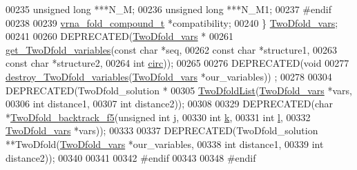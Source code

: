 \begin{DoxyCode}
00235   \textcolor{keywordtype}{unsigned} \textcolor{keywordtype}{long}         ***N\_M;
00236   \textcolor{keywordtype}{unsigned} \textcolor{keywordtype}{long}         ***N\_M1;
00237 \textcolor{preprocessor}{#endif}
00238 
00239   \hyperlink{group__fold__compound_structvrna__fc__s}{vrna\_fold\_compound\_t}  *compatibility;
00240 \} \hyperlink{group__kl__neighborhood__mfe_gaf4f514010a14f9d59d850742b3e96954}{TwoDfold\_vars};
00241 
00260 DEPRECATED(\hyperlink{group__kl__neighborhood__mfe_structTwoDfold__vars}{TwoDfold\_vars} *
00261            \hyperlink{group__kl__neighborhood__mfe_gac9284f132cf0eaa0a2f43590eda05488}{get\_TwoDfold\_variables}(\textcolor{keyword}{const} \textcolor{keywordtype}{char}  *seq,
00262                                   \textcolor{keyword}{const} \textcolor{keywordtype}{char}  *structure1,
00263                                   \textcolor{keyword}{const} \textcolor{keywordtype}{char}  *structure2,
00264                                   \textcolor{keywordtype}{int}         \hyperlink{group__model__details_gaf9202a1a09f5828dc731e2d9a10fa111}{circ}));
00265 
00276 DEPRECATED(\textcolor{keywordtype}{void}
00277            \hyperlink{group__kl__neighborhood__mfe_ga05bf4f31d216b1b160fd2d3d68e9b487}{destroy\_TwoDfold\_variables}(\hyperlink{group__kl__neighborhood__mfe_structTwoDfold__vars}{TwoDfold\_vars} *our\_variables))
      ;
00278 
00304 DEPRECATED(TwoDfold\_solution *
00305            \hyperlink{group__kl__neighborhood__mfe_ga7fc5e3e92fe97914ca4eccd33c01c2a7}{TwoDfoldList}(\hyperlink{group__kl__neighborhood__mfe_structTwoDfold__vars}{TwoDfold\_vars} *vars,
00306                         \textcolor{keywordtype}{int}           distance1,
00307                         \textcolor{keywordtype}{int}           distance2));
00308 
00329 DEPRECATED(\textcolor{keywordtype}{char} *\hyperlink{group__kl__neighborhood__mfe_gaf4dc05bf8fc1ea53acd7aeb798ba80c2}{TwoDfold\_backtrack\_f5}(\textcolor{keywordtype}{unsigned} \textcolor{keywordtype}{int}   j,
00330                                        \textcolor{keywordtype}{int}            \hyperlink{group__kl__neighborhood__mfe_ac111e850bb3b3a11b6b5707912cfa1b8}{k},
00331                                        \textcolor{keywordtype}{int}            \hyperlink{group__kl__neighborhood__mfe_ab8e95cd920901175a2cc8de726ab1d36}{l},
00332                                        \hyperlink{group__kl__neighborhood__mfe_structTwoDfold__vars}{TwoDfold\_vars}  *vars));
00333 
00337 DEPRECATED(TwoDfold\_solution **TwoDfold(\hyperlink{group__kl__neighborhood__mfe_structTwoDfold__vars}{TwoDfold\_vars} *our\_variables,
00338                                         \textcolor{keywordtype}{int}           distance1,
00339                                         \textcolor{keywordtype}{int}           distance2));
00340 
00341 
00342 \textcolor{preprocessor}{#endif}
00343 
00348 \textcolor{preprocessor}{#endif}
\end{DoxyCode}
